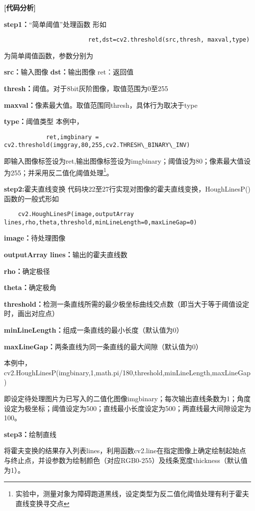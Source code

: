 \documentclass{article}
\begin{document}
\textbf{[代码分析]}

\textbf{step1：}“简单阈值”处理函数
形如
\begin{lstlisting}
                        ret,dst=cv2.threshold(src,thresh, maxval,type)
\end{lstlisting}

为简单阈值函数，参数分别为

\textbf{src：}输入图像
\textbf{dst：}输出图像	ret：返回值

\textbf{thresh：}阈值。对于8bit灰阶图像，取值范围为0至255

\textbf{maxval：}像素最大值。取值范围同thresh，具体行为取决于type

\textbf{type：}阈值类型
本例中，
\begin{lstlisting}
            ret,imgbinary = cv2.threshold(imggray,80,255,cv2.THRESH\_BINARY\_INV)
\end{lstlisting}

即输入图像标签设为ret,输出图像标签设为imgbinary；阈值设为80；像素最大值设为255；并采用反二值化阈值处理\footnote{实验中，测量对象为障碍跑道黑线，设定类型为反二值化阈值处理有利于霍夫直线变换寻交点}。

\textbf{step2:}霍夫直线变换
代码块22至27行实现对图像的霍夫直线变换，HoughLinesP()函数的一般式形如
\begin{lstlisting}
    cv2.HoughLinesP(image,outputArray lines,rho,theta,threshold,minLineLength=0,maxLineGap=0)
\end{lstlisting}

\textbf{image：}待处理图像

\textbf{outputArray lines：}输出的霍夫直线数

\textbf{rho：}确定极径

\textbf{theta：}确定极角

\textbf{threshold：}检测一条直线所需的最少极坐标曲线交点数（即当大于等于阈值设定时，画出对应点）

\textbf{minLineLength：}组成一条直线的最小长度（默认值为0）

\textbf{maxLineGap：}两条直线为同一条直线的最大间隙（默认值为0）

本例中，
cv2.HoughLinesP(imgbinary,1,math.pi/180,threshold,minLineLength,maxLineGap)

即设定待处理图片为已写入的二值化图像imgbinary；每次输出直线条数为1；角度设定为极坐标；阈值设定为500；直线最小长度设定为500；两直线最大间隙设定为100。

\textbf{step3：}绘制直线

将霍夫变换的结果存入列表lines，利用函数cv2.line在指定图像上确定绘制起始点与终止点，并设参数为绘制颜色（对应RGB0-255）及线条宽度thickness（默认值为1）。
\end{document}
